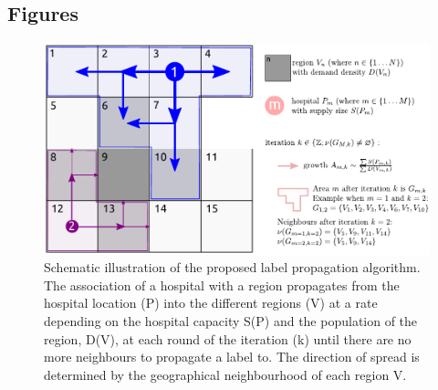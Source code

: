 \documentclass[twocolumn]{bmcart}%
\begin{document}
\begin{backmatter}


\section*{Figures}

\begin{figure}[h!]
  \includegraphics{FIG1_example} 
  \caption{Schematic illustration of the proposed label propagation algorithm. The association of a hospital with a 
region propagates from the hospital location (P) into the different regions (V) at a rate depending on the hospital 
capacity S(P) and the population of the region, D(V), at each round of the iteration (k) until there are no more 
neighbours to propagate a label to. The direction of spread is determined by the geographical neighbourhood of each 
region V.}
  \label{fig:one}
\end{figure}


\end{backmatter}
\end{document}
